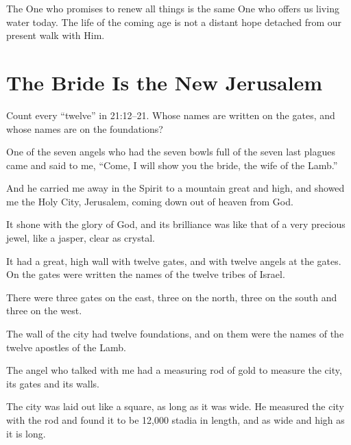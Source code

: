 The One who promises to renew all things is the same One who offers us living water today. The life of the coming age is not a distant hope detached from our present walk with Him. 

\section{The Bride Is the New Jerusalem}

\begin{ScriptureBox2}{Count every ``twelve'' in 21:12--21. Whose names are written on the gates, and whose names are on the foundations?}

\item[21:9] One of the seven angels who had the seven bowls full of the seven last plagues came and said to me, ``Come, I will show you the bride, the wife of the Lamb.''

\item[21:10] And he carried me away in the Spirit to a mountain great and high, and showed me the Holy City, Jerusalem, coming down out of heaven from God.

\item[21:11] It shone with the glory of God, and its brilliance was like that of a very precious jewel, like a jasper, clear as crystal.

\item[21:12] It had a great, high wall with twelve gates, and with twelve angels at the gates. On the gates were written the names of the twelve tribes of Israel.

\item[21:13] There were three gates on the east, three on the north, three on the south and three on the west.

\item[21:14] The wall of the city had twelve foundations, and on them were the names of the twelve apostles of the Lamb.

\item[21:15] The angel who talked with me had a measuring rod of gold to measure the city, its gates and its walls.

\item[21:16] The city was laid out like a square, as long as it was wide. He measured the city with the rod and found it to be 12,000 stadia in length, and as wide and high as it is long.


\end{ScriptureBox2}
